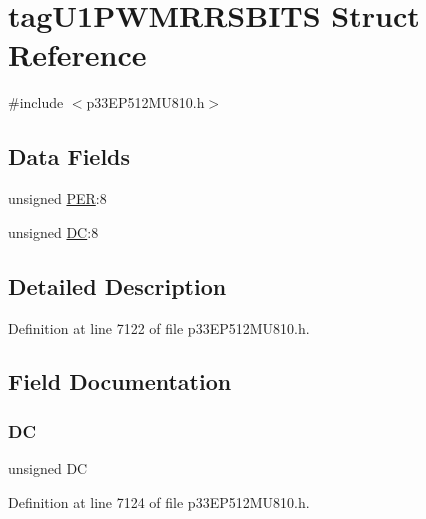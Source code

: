\hypertarget{structtag_u1_p_w_m_r_r_s_b_i_t_s}{}\section{tag\+U1\+P\+W\+M\+R\+R\+S\+B\+I\+TS Struct Reference}
\label{structtag_u1_p_w_m_r_r_s_b_i_t_s}


{\ttfamily \#include $<$p33\+E\+P512\+M\+U810.\+h$>$}

\subsection*{Data Fields}
\begin{DoxyCompactItemize}
\item 
unsigned \hyperlink{structtag_u1_p_w_m_r_r_s_b_i_t_s_a41bb45090080ae50a6d109a3920acf29}{P\+ER}\+:8
\item 
unsigned \hyperlink{structtag_u1_p_w_m_r_r_s_b_i_t_s_a3d90f65cd752460060c0eba9c09f9034}{DC}\+:8
\end{DoxyCompactItemize}


\subsection{Detailed Description}


Definition at line 7122 of file p33\+E\+P512\+M\+U810.\+h.



\subsection{Field Documentation}
\mbox{\label{structtag_u1_p_w_m_r_r_s_b_i_t_s_a3d90f65cd752460060c0eba9c09f9034}} 
\subsubsection{\texorpdfstring{DC}{DC}}
{\footnotesize\ttfamily unsigned DC}



Definition at line 7124 of file p33\+E\+P512\+M\+U810.\+h.

\mbox{\label{structtag_u1_p_w_m_r_r_s_b_i_t_s_a41bb45090080ae50a6d109a3920acf29}} 
